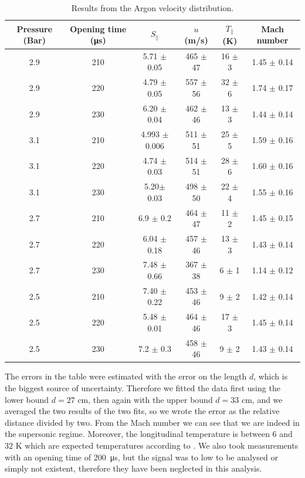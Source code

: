 \documentclass[a4paper,10pt]{article}
\begin{document}
\begin{table}[H]
\centering
\begin{tabular}{cccccc} \toprule
Pressure (Bar) & Opening time (\si{\micro \s}) & $S_\parallel$ & $u$ (m/s) & $T_\parallel$ (K) & Mach number \\ \midrule

2.9 & 210 & 5.71 $\pm$ 0.05 & 465 $\pm$ 47 & 16 $\pm$ 3 & 1.45 $\pm$ 0.14 \\
2.9 & 220 & 4.79 $\pm$ 0.05 & 557 $\pm$ 56 & 32 $\pm$ 6 & 1.74 $\pm$ 0.17 \\
2.9 & 230 & 6.20 $\pm$ 0.04 & 462 $\pm$ 46 & 13 $\pm$ 3 & 1.44 $\pm$ 0.14 \\ \midrule
3.1 & 210 & 4.993 $\pm$ 0.006 & 511 $\pm$ 51 & 25 $\pm$ 5 & 1.59 $\pm$ 0.16 \\
3.1 & 220 & 4.74 $\pm$ 0.03 & 514 $\pm$ 51 & 28 $\pm$ 6 & 1.60 $\pm$ 0.16 \\
3.1 & 230 & 5.20$\pm$ 0.03 & 498 $\pm$ 50 & 22 $\pm$ 4 & 1.55 $\pm$ 0.16 \\
\midrule
2.7 & 210 & 6.9 $\pm$ 0.2 & 464 $\pm$ 47 & 11 $\pm$ 2 & 1.45 $\pm$ 0.15\\
2.7 & 220 & 6.04 $\pm$ 0.18 & 457 $\pm$ 46 & 13 $\pm$ 3 & 1.43 $\pm$ 0.14\\
2.7 & 230 & 7.48 $\pm$ 0.66 & 367 $\pm$ 38 & 6 $\pm$ 1 & 1.14 $\pm$ 0.12\\ 
\midrule
2.5 & 210 & 7.40 $\pm$ 0.22 & 453 $\pm$ 46& 9 $\pm$ 2 & 1.42 $\pm$ 0.14 \\
2.5 & 220 & 5.48 $\pm$ 0.01 & 464 $\pm$ 46 & 17 $\pm$ 3 & 1.45 $\pm$ 0.14 \\
2.5 & 230 & 7.2 $\pm$ 0.3 & 458 $\pm$ 46 & 9 $\pm$ 2 & 1.43 $\pm$ 0.14 \\ \bottomrule
\end{tabular}
\caption{Results from the Argon velocity distribution.}
\end{table}
The errors in the table were estimated with the error on the length $d$, which is the biggest source of uncertainty. Therefore we fitted the data first using the lower bound $d = 27$ cm, then again with the upper bound $d= 33$ cm, and we averaged the two results of the two fits, so we wrote the error as the relative distance divided by two. From the Mach number we can see that we are indeed in the supersonic regime. Moreover, the longitudinal temperature is between 6 and 32 K which are expected temperatures according to \cite{illinois}. We also took measurements with an opening time of \SI{200}{\micro \s}, but the signal was to low to be analysed or simply not existent, therefore they have been neglected in this analysis.
\end{document}
